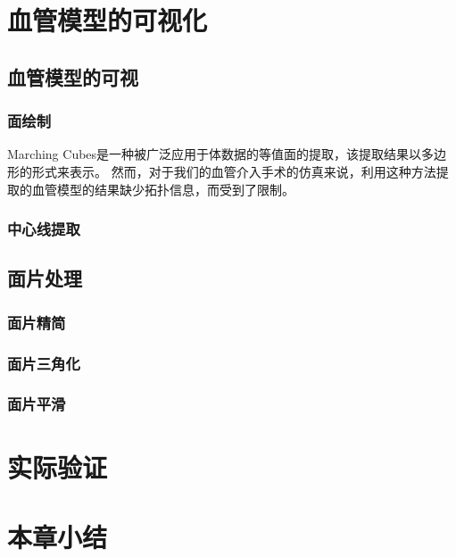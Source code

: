\section{血管模型的可视化}

\subsection{血管模型的可视}

\subsubsection{面绘制}

Marching Cubes\cite{Lorensen1987MC}是一种被广泛应用于体数据的等值面的提取，该提取结果以多边形的形式来表示。
然而，对于我们的血管介入手术的仿真来说，利用这种方法提取的血管模型的结果缺少拓扑信息，而受到了限制\cite{Nowinski2001NeuroCath}\cite{Hahn1998GWU}。

\subsubsection{中心线提取}

\subsection{面片处理}

\subsubsection{面片精简}

\subsubsection{面片三角化}

\subsubsection{面片平滑}


\section{实际验证}

\section{本章小结} 